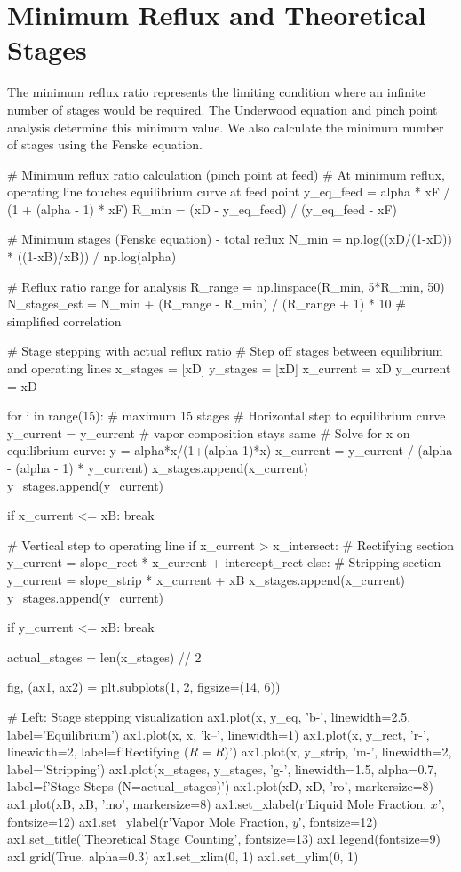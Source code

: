 \documentclass[11pt,a4paper]{article}
\begin{document}
\section{Minimum Reflux and Theoretical Stages}

The minimum reflux ratio represents the limiting condition where an infinite number of stages would be required. The Underwood equation and pinch point analysis determine this minimum value. We also calculate the minimum number of stages using the Fenske equation.

\begin{pycode}
# Minimum reflux ratio calculation (pinch point at feed)
# At minimum reflux, operating line touches equilibrium curve at feed point
y_eq_feed = alpha * xF / (1 + (alpha - 1) * xF)
R_min = (xD - y_eq_feed) / (y_eq_feed - xF)

# Minimum stages (Fenske equation) - total reflux
N_min = np.log((xD/(1-xD)) * ((1-xB)/xB)) / np.log(alpha)

# Reflux ratio range for analysis
R_range = np.linspace(R_min, 5*R_min, 50)
N_stages_est = N_min + (R_range - R_min) / (R_range + 1) * 10  # simplified correlation

# Stage stepping with actual reflux ratio
# Step off stages between equilibrium and operating lines
x_stages = [xD]
y_stages = [xD]
x_current = xD
y_current = xD

for i in range(15):  # maximum 15 stages
    # Horizontal step to equilibrium curve
    y_current = y_current  # vapor composition stays same
    # Solve for x on equilibrium curve: y = alpha*x/(1+(alpha-1)*x)
    x_current = y_current / (alpha - (alpha - 1) * y_current)
    x_stages.append(x_current)
    y_stages.append(y_current)

    if x_current <= xB:
        break

    # Vertical step to operating line
    if x_current > x_intersect:
        # Rectifying section
        y_current = slope_rect * x_current + intercept_rect
    else:
        # Stripping section
        y_current = slope_strip * x_current + xB
    x_stages.append(x_current)
    y_stages.append(y_current)

    if y_current <= xB:
        break

actual_stages = len(x_stages) // 2

fig, (ax1, ax2) = plt.subplots(1, 2, figsize=(14, 6))

# Left: Stage stepping visualization
ax1.plot(x, y_eq, 'b-', linewidth=2.5, label='Equilibrium')
ax1.plot(x, x, 'k--', linewidth=1)
ax1.plot(x, y_rect, 'r-', linewidth=2, label=f'Rectifying ($R={R}$)')
ax1.plot(x, y_strip, 'm-', linewidth=2, label='Stripping')
ax1.plot(x_stages, y_stages, 'g-', linewidth=1.5, alpha=0.7, label=f'Stage Steps (N={actual_stages})')
ax1.plot(xD, xD, 'ro', markersize=8)
ax1.plot(xB, xB, 'mo', markersize=8)
ax1.set_xlabel(r'Liquid Mole Fraction, $x$', fontsize=12)
ax1.set_ylabel(r'Vapor Mole Fraction, $y$', fontsize=12)
ax1.set_title('Theoretical Stage Counting', fontsize=13)
ax1.legend(fontsize=9)
ax1.grid(True, alpha=0.3)
ax1.set_xlim(0, 1)
ax1.set_ylim(0, 1)


\end{pycode}
\end{document}

